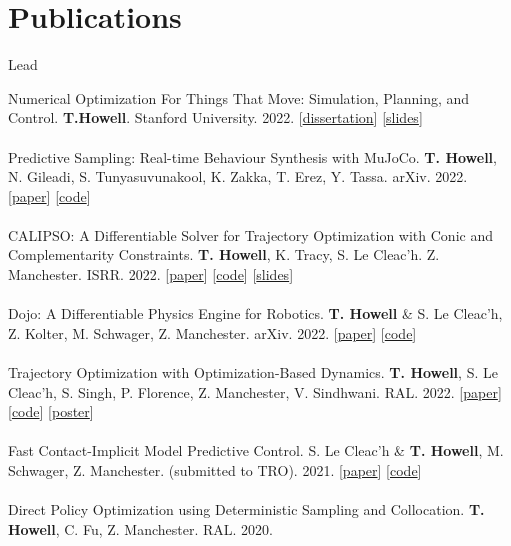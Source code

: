 \documentclass[10pt]{article}
\begin{document}
\section*{Publications}
\begin{center} Lead \end{center}
Numerical Optimization For Things That Move: Simulation, Planning, and Control. \textbf{T.Howell}. Stanford University. 2022. 
[\href{https://github.com/thowell/thesis/blob/main/main.pdf}{dissertation}]
[\href{https://docs.google.com/presentation/d/1ypalKNcd1hAI59Fur3mFP5FYANqrQ1Smk2gUb-UiBIA/edit?usp=sharing}{slides}]
\\
\\
Predictive Sampling: Real-time Behaviour Synthesis with MuJoCo. \textbf{T. Howell}, N. Gileadi, S. Tunyasuvunakool, K. Zakka, T. Erez, Y. Tassa. arXiv. 2022. 
[\href{https://arxiv.org/abs/2212.00541}{paper}]
[\href{https://github.com/deepmind/mujoco_mpc}{code}]
\\
\\
CALIPSO: A Differentiable Solver for Trajectory Optimization with Conic and Complementarity Constraints. \textbf{T. Howell}, K. Tracy, S. Le Cleac'h. Z. Manchester. ISRR. 2022.
[\href{https://arxiv.org/abs/2205.09255}{paper}]
[\href{https://github.com/thowell/CALIPSO.jl}{code}]
[\href{https://slides.com/taylorhowell/calipso}{slides}]
\\
\\
Dojo: A Differentiable Physics Engine for Robotics. \textbf{T. Howell} \& S. Le Cleac'h, Z. Kolter, M. Schwager, Z. Manchester. arXiv. 2022. 
[\href{https://arxiv.org/abs/2203.00806}{paper}]
[\href{https://github.com/dojo-sim}{code}]
\\
\\
Trajectory Optimization with Optimization-Based Dynamics. \textbf{T. Howell}, S. Le Cleac'h, S. Singh, P. Florence, Z. Manchester, V. Sindhwani. RAL. 2022. 
[\href{https://arxiv.org/abs/2109.04928}{paper}]
[\href{https://github.com/thowell/optimization_dynamics}{code}]
[\href{https://github.com/thowell/cv/blob/master/posters/optimization_dynamics_poster.pdf}{poster}]
\\
\\
Fast Contact-Implicit Model Predictive Control. S. Le Cleac'h \& \textbf{T. Howell}, M. Schwager, Z. Manchester. (submitted to TRO). 2021. 
[\href{https://arxiv.org/abs/2107.05616v2}{paper}]
[\href{https://github.com/thowell/ContactImplicitMPC.jl}{code}]
\\
\\
Direct Policy Optimization using Deterministic Sampling and Collocation. \textbf{T. Howell}, C. Fu, Z. Manchester. RAL. 2020. 
\end{document}
